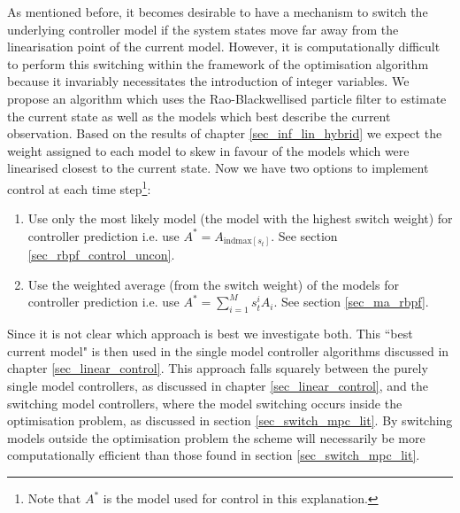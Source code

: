 As mentioned before, it becomes desirable to have a mechanism to switch the underlying controller model if the system states move far away from the linearisation point of the current model. However, it is computationally difficult to perform this switching within the framework of the optimisation algorithm because it invariably necessitates the introduction of integer variables. We propose an algorithm which uses the Rao-Blackwellised particle filter to estimate the current state as well as the models which best describe the current observation. Based on the results of chapter \ref{sec_inf_lin_hybrid} we expect the weight assigned to each model to skew in favour of the models which were linearised closest to the current state. Now we have two options to implement control at each time step\footnote{Note that $A^*$ is the model used for control in this explanation.}:
\begin{enumerate}
\item
Use only the most likely model (the model with the highest switch weight) for controller prediction i.e. use $A^* = A_{\text{indmax}[s_t]}$. See section \ref{sec_rbpf_control_uncon}.
\item
Use the weighted average (from the switch weight) of the models for controller prediction i.e. use $A^* = \sum_{i=1}^M s_t^i A_i$. See section \ref{sec_ma_rbpf}.
\end{enumerate}
Since it is not clear which approach is best we investigate both. This ``best current model" is then used in the single model controller algorithms discussed in chapter \ref{sec_linear_control}. This approach falls squarely between the purely single model controllers, as discussed in chapter \ref{sec_linear_control}, and the switching model controllers, where the model switching occurs inside the optimisation problem, as discussed in section \ref{sec_switch_mpc_lit}. By switching models outside the optimisation problem the scheme will necessarily be more computationally efficient than those found in section \ref{sec_switch_mpc_lit}. 

